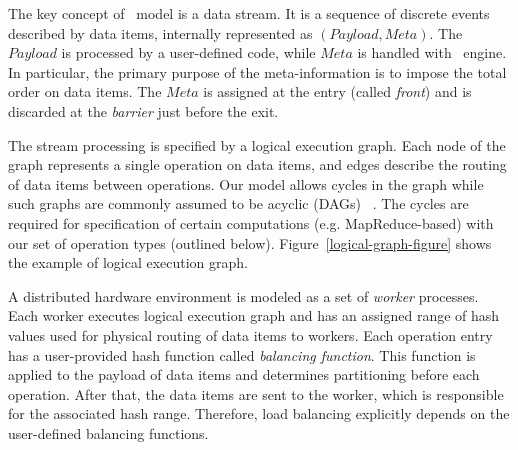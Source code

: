 \label{model-section}

The key concept of \FlameStream\ model is a data stream. It is a sequence of discrete events described by data items, internally represented as $(Payload, Meta)$. The $Payload$ is processed by a user-defined code, while $Meta$ is handled with \FlameStream\ engine. In particular, the primary purpose of the meta-information is to impose the total order on data items. The $Meta$ is assigned at the entry (called {\em front}) and is discarded at the {\em barrier} just before the exit. 

The stream processing is specified by a logical execution graph. Each node of the graph represents a single operation on data items, and edges describe the routing of data items between operations. Our model allows cycles in the graph while such graphs are commonly assumed to be acyclic (DAGs) ~\cite{Zaharia:2016:ASU:3013530.2934664, Carbone:2017:SMA:3137765.3137777}. The cycles are required for specification of certain computations (e.g. MapReduce-based) with our set of operation types (outlined below). Figure~\ref{logical-graph-figure} shows the example of logical execution graph.

A distributed hardware environment is modeled as a set of {\em worker} processes. Each worker executes logical execution graph and has an assigned range of hash values used for physical routing of data items to workers. Each operation entry has a user-provided hash function called {\it balancing function}. This function is applied to the payload of data items and determines partitioning before each operation. After that, the data items are sent to the worker, which is responsible for the associated hash range. Therefore, load balancing explicitly depends on the user-defined balancing functions. 

